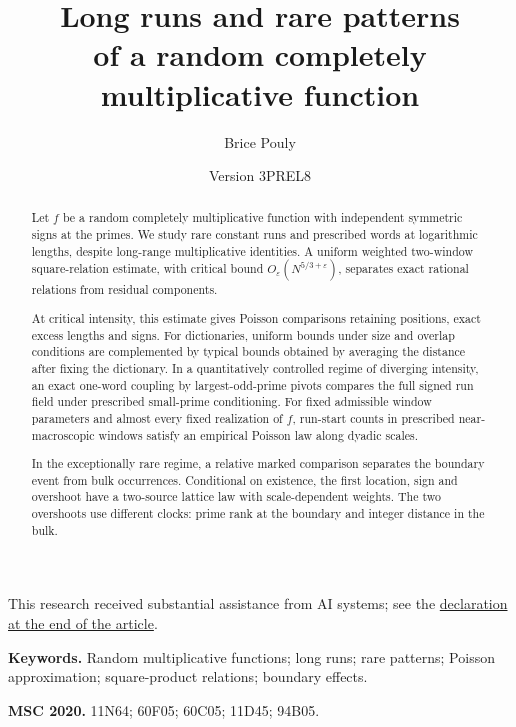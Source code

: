 \documentclass[11pt,a4paper]{article}
\title{\textbf{Long runs and rare patterns}\\[1mm]
\large of a random completely multiplicative function}
\author{Brice Pouly}
\date{Version 3PREL8}
\begin{document}
\maketitle
\vspace{-0.6em}
\noindent\begin{minipage}{\textwidth}\footnotesize
This research received substantial assistance from AI systems; see the
\hyperref[sec:ai-assistance]{declaration at the end of the article}.
\end{minipage}\medskip
\begin{abstract}
Let $f$ be a random completely multiplicative function with independent
symmetric signs at the primes. We study rare constant runs and prescribed
words at logarithmic lengths, despite long-range multiplicative identities.
A uniform weighted two-window square-relation estimate, with critical
bound $O_\varepsilon(N^{5/3+\varepsilon})$, separates exact rational
relations from residual components.

At critical intensity, this estimate gives Poisson comparisons retaining
positions, exact excess lengths and signs. For dictionaries, uniform
bounds under size and overlap conditions are complemented by typical
bounds obtained by averaging the distance after fixing the dictionary.
In a quantitatively controlled regime of diverging intensity, an exact
one-word coupling by largest-odd-prime pivots compares the full signed
run field under prescribed small-prime conditioning. For fixed
admissible window parameters and almost every fixed realization of $f$,
run-start counts in prescribed near-macroscopic windows satisfy an
empirical Poisson law along dyadic scales.

In the exceptionally rare regime, a relative marked comparison separates
the boundary event from bulk occurrences. Conditional on existence, the
first location, sign and overshoot have a two-source lattice law with
scale-dependent weights. The two overshoots use different clocks: prime
rank at the boundary and integer distance in the bulk.
\end{abstract}

\medskip
\noindent\textbf{Keywords.} Random multiplicative functions; long runs;
rare patterns; Poisson approximation; square-product relations; boundary effects.
\par\smallskip
\noindent\textbf{MSC 2020.} 11N64; 60F05; 60C05; 11D45; 94B05.
\clearpage
\tableofcontents









\printbibliography[heading=bibintoc,title={References}]
\end{document}
